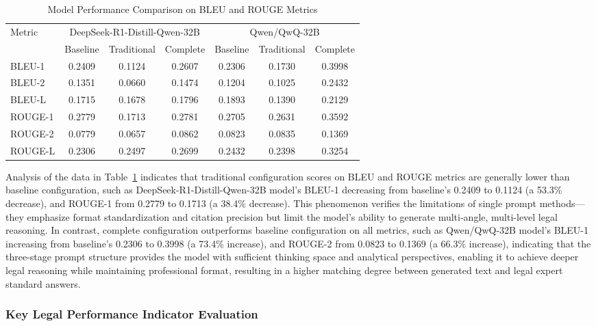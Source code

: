 \documentclass{article}
\theoremstyle{plain}
\theoremstyle{definition}
\begin{document}
\begin{table}[htbp]
\centering
\caption{Model Performance Comparison on BLEU and ROUGE Metrics}
\label{tab1}
\renewcommand{\arraystretch}{1.2}
\begin{tabularx}{\textwidth}{X *{6}{c}}
\toprule
\multirow{2}{*}{Metric} & \multicolumn{3}{c}{DeepSeek-R1-Distill-Qwen-32B} & \multicolumn{3}{c}{Qwen/QwQ-32B} \\
\cmidrule(lr){2-4} \cmidrule(lr){5-7}
 & Baseline & Traditional & Complete & Baseline & Traditional & Complete \\
\midrule
BLEU-1 & 0.2409 & 0.1124 & 0.2607 & 0.2306 & 0.1730 & 0.3998 \\
BLEU-2 & 0.1351 & 0.0660 & 0.1474 & 0.1204 & 0.1025 & 0.2432 \\
BLEU-L & 0.1715 & 0.1678 & 0.1796 & 0.1893 & 0.1390 & 0.2129 \\
ROUGE-1 & 0.2779 & 0.1713 & 0.2781 & 0.2705 & 0.2631 & 0.3592 \\
ROUGE-2 & 0.0779 & 0.0657 & 0.0862 & 0.0823 & 0.0835 & 0.1369 \\
ROUGE-L & 0.2306 & 0.2497 & 0.2699 & 0.2432 & 0.2398 & 0.3254 \\
\bottomrule
\end{tabularx}
\end{table}

Analysis of the data in Table~\ref{tab1} indicates that traditional configuration scores on BLEU and ROUGE metrics are generally lower than baseline configuration, such as DeepSeek-R1-Distill-Qwen-32B model's BLEU-1 decreasing from baseline's 0.2409 to 0.1124 (a 53.3\% decrease), and ROUGE-1 from 0.2779 to 0.1713 (a 38.4\% decrease). This phenomenon verifies the limitations of single prompt methods—they emphasize format standardization and citation precision but limit the model's ability to generate multi-angle, multi-level legal reasoning. In contrast, complete configuration outperforms baseline configuration on all metrics, such as Qwen/QwQ-32B model's BLEU-1 increasing from baseline's 0.2306 to 0.3998 (a 73.4\% increase), and ROUGE-2 from 0.0823 to 0.1369 (a 66.3\% increase), indicating that the three-stage prompt structure provides the model with sufficient thinking space and analytical perspectives, enabling it to achieve deeper legal reasoning while maintaining professional format, resulting in a higher matching degree between generated text and legal expert standard answers.

\FloatBarrier
\subsubsection{Key Legal Performance Indicator Evaluation}
\label{sec4.2.2}
\end{document}
